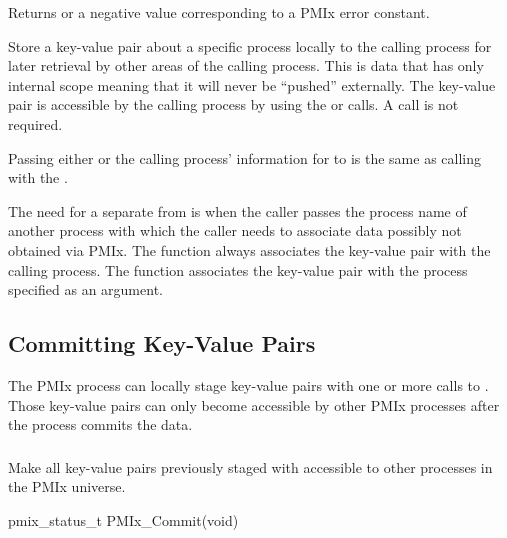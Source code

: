 Returns  or a negative value corresponding to a PMIx error constant.

\descr

Store a key-value pair about a specific process locally to the calling process for later retrieval by other areas of the calling process.
This is data that has only internal scope meaning that it will never be ``pushed'' externally.
The key-value pair is accessible by the calling process by using the  or  calls.
A  call is not required.

\adviceuserstart
Passing either  or the calling process' information for  to  is the same as calling  with the  .

The need for a  separate from  is when the caller passes  the process name of another process with which the caller needs to associate data possibly not obtained via \ac{PMIx}.
The  function always associates the key-value pair with the calling process.
The  function associates the key-value pair with the process specified as an argument.
\adviceuserend


\subsection{Committing Key-Value Pairs}

The \ac{PMIx} process can locally stage key-value pairs with one or more calls to .
Those key-value pairs can only become accessible by other \ac{PMIx} processes after the process commits the data.


\subsubsection{}

\summary

Make all key-value pairs previously staged with  accessible to other processes in the \ac{PMIx} universe.

\format

\cspecificstart
\begin{codepar}
pmix_status_t PMIx_Commit(void)
\end{codepar}
\cspecificend

